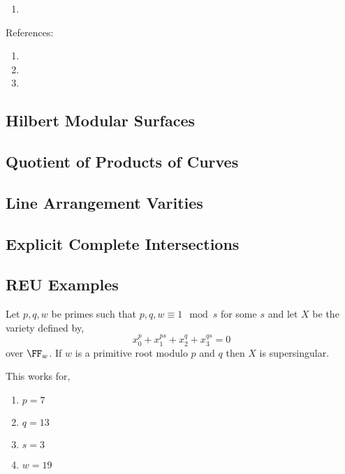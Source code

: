 \documentclass[12pt]{article}
\begin{document}
\begin{enumerate}
\item 
\end{enumerate}

References:

\begin{enumerate}
\item {}
\item {}
\item 
\end{enumerate}

\subsection{Hilbert Modular Surfaces}


\subsection{Quotient of Products of Curves}

\subsection{Line Arrangement Varities}

\subsection{Explicit Complete Intersections}


\subsection{REU Examples}


\begin{theorem}
Let $p, q, w$ be primes such that $p, q, w \equiv 1 \mod{s}$ for some $s$ and let $X$ be the variety defined by,
\[ x_0^p + x_1^{ps} + x_2^{q} + x_3^{qs} = 0 \]
over $\FF_{w}$. If $w$ is a primitive root modulo $p$ and $q$ then $X$ is supersingular.  
\end{theorem}

\begin{example}
This works for,
\begin{enumerate}
\item $p = 7$
\item $q = 13$
\item $s = 3$
\item $w = 19$
\end{enumerate}
\end{example}
\end{document}
